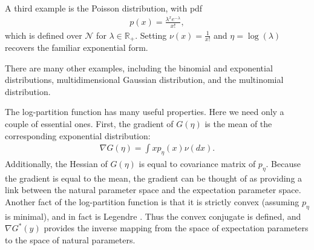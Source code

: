 \documentclass{article}
\newcommand{\R}{\mathbb{R}}
\newcommand{\N}{\mathcal{N}}
\begin{document}
A third example is the Poisson distribution, with pdf 
\begin{align*}
p(x) = \frac{\lambda^xe^{-\lambda}}{x!},
\end{align*}
which is defined over $\N$ for $\lambda\in\R_+$.  Setting $\nu(x) =
\frac{1}{x!}$ and $\eta = \log(\lambda)$ recovers the familiar
exponential form.  
 
There are many other examples, including the binomial and exponential
distributions, multidimensional Gaussian distribution, and the
multinomial distribution.  

The log-partition function has many useful properties. Here we need
only a couple of essential ones.  First, the gradient of $G(\eta)$
is the mean of the corresponding exponential distribution:
\begin{align*}
\nabla G(\eta) = \int x p_\eta(x) \nu(dx).
\end{align*}
Additionally, the Hessian of $G(\eta)$ is equal to covariance matrix of
$p_\eta$.  Because the gradient is equal to the mean, the gradient can be
thought of as providing a link between the natural parameter space and
the expectation parameter space.  Another fact of the log-partition
function is that it is strictly convex (assuming ${p_\eta}$ is
minimal), and in fact is Legendre \cite{bm.05}.  Thus the convex
conjugate is defined, and $\nabla G^*(y)$ provides the inverse mapping
from the space of expectation parameters to the space of natural
parameters.  
\end{document}
